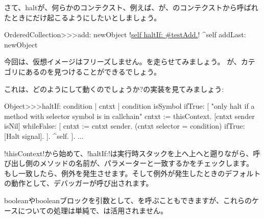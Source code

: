 \documentclass[a4paper,10pt,twoside]{book}
\begin{document}
さて、haltが、何らかのコンテクスト、例えば、が、のコンテクストから呼ばれたときにだけ起こるようにしたいとしましょう。%

\begin{code}{}
OrderedCollection>>>add: newObject
	!\underline{self haltIf: \#testAdd.}!
	^self addLast: newObject
\end{code}

今回は、仮想イメージはフリーズしません。を走らせてみましょう。
が、カテゴリにあるのを見つけることができるでしょう。%

これは、どのようにして動くのでしょうか?の実装を見てみましょう:
\begin{code}{}
Object>>>haltIf: condition
	| cntxt |
	condition isSymbol ifTrue: [
		"only halt if a method with selector symbol is in callchain"
		cntxt := thisContext.
		[cntxt sender isNil] whileFalse: [
			cntxt := cntxt sender. 
			(cntxt selector = condition) ifTrue: [Halt signal]. ].
		^self.
	].
	...
\end{code}

\ct!thisContext!から始めて、\ct!haltIf:!は実行時スタックを上へ上へと遡りながら、呼び出し側のメソッドの名前が、パラメーターと一致するかをチェックします。
もし一致したら、例外を発生させます。そして例外が発生したときのデフォルトの動作として、デバッガーが呼び出されます。

booleanやbooleanブロックを引数として、を呼ぶこともできますが、これらのケースについての処理は単純で、は活用されません。
\end{document}
